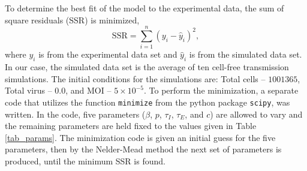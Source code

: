 To determine the best fit of the model to the experimental data, the sum of square residuals (SSR) is minimized, $$\mathrm{SSR} = \sum_{i=1}^{n} (y_i - \hat y_i)^{2},$$ where $y_i$ is from the experimental data set and $\hat y_i$ is from the simulated data set. In our case, the simulated data set is the average of ten cell-free transmission simulations. The initial conditions for the simulations are: Total cells -- $1001365$, Total virus -- $0.0$, and MOI -- $5\times 10^{-5}$. To perform the minimization, a separate code that utilizes the function \texttt{minimize} from the python package \texttt{scipy}, was written. In the code, five parameters ($\beta$, $p$, $\tau_I$, $\tau_E$, and $c$) are allowed to vary and the remaining parameters are held fixed to the values given in Table \ref{tab_params}. The minimization code is given an initial guess for the five parameters, then by the Nelder-Mead method the next set of parameters is produced, until the minimum SSR is found.

